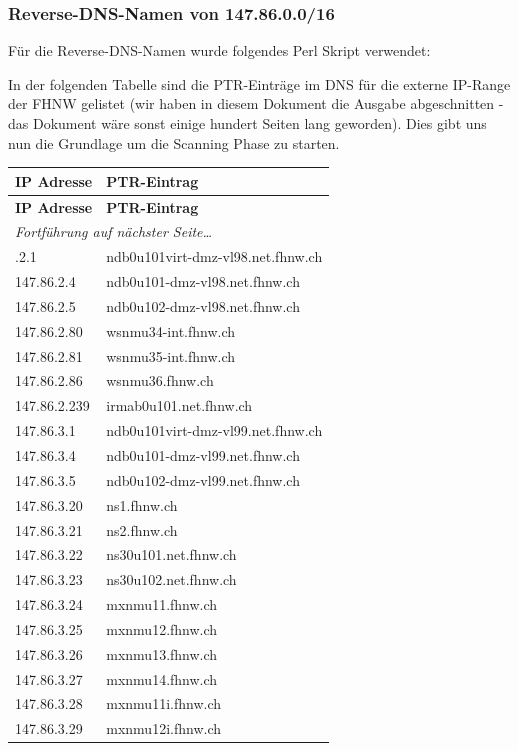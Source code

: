 \documentclass[a4paper,11pt]{scrartcl}
\begin{document}
\subsubsection{Reverse-DNS-Namen von 147.86.0.0/16}
Für die Reverse-DNS-Namen wurde folgendes Perl Skript verwendet:


In der folgenden Tabelle sind die PTR-Einträge im DNS für die externe IP-Range der FHNW gelistet (wir haben in diesem Dokument die Ausgabe abgeschnitten - das Dokument wäre sonst einige hundert Seiten lang geworden). Dies gibt uns nun die Grundlage um die Scanning Phase zu starten.
\begin{longtable}{p{2.5cm}|p{7cm}}
	\textbf{IP Adresse} & \textbf{PTR-Eintrag} \\
	\endfirsthead
	\textbf{IP Adresse} & \textbf{PTR-Eintrag} \\
	\endhead
	\multicolumn{2}{l}{\textit{Fortführung auf nächster Seite\ldots}} \\
	\endfoot
	\endlastfoot
	147.86.2.1 & ndb0u101virt-dmz-vl98.net.fhnw.ch \\ 
	147.86.2.4 & ndb0u101-dmz-vl98.net.fhnw.ch \\ 
	147.86.2.5 & ndb0u102-dmz-vl98.net.fhnw.ch \\ 
	147.86.2.80 & wsnmu34-int.fhnw.ch \\ 
	147.86.2.81 & wsnmu35-int.fhnw.ch \\ 
	147.86.2.86 & wsnmu36.fhnw.ch \\ 
	147.86.2.239 & irmab0u101.net.fhnw.ch \\ 
	147.86.3.1 & ndb0u101virt-dmz-vl99.net.fhnw.ch \\ 
	147.86.3.4 & ndb0u101-dmz-vl99.net.fhnw.ch \\ 
	147.86.3.5 & ndb0u102-dmz-vl99.net.fhnw.ch \\ 
	147.86.3.20 & ns1.fhnw.ch \\ 
	147.86.3.21 & ns2.fhnw.ch \\ 
	147.86.3.22 & ns30u101.net.fhnw.ch \\ 
	147.86.3.23 & ns30u102.net.fhnw.ch \\ 
	147.86.3.24 & mxnmu11.fhnw.ch \\ 
	147.86.3.25 & mxnmu12.fhnw.ch \\ 
	147.86.3.26 & mxnmu13.fhnw.ch \\ 
	147.86.3.27 & mxnmu14.fhnw.ch \\ 
	147.86.3.28 & mxnmu11i.fhnw.ch \\ 
	147.86.3.29 & mxnmu12i.fhnw.ch \\ 

\end{longtable}
\end{document}
